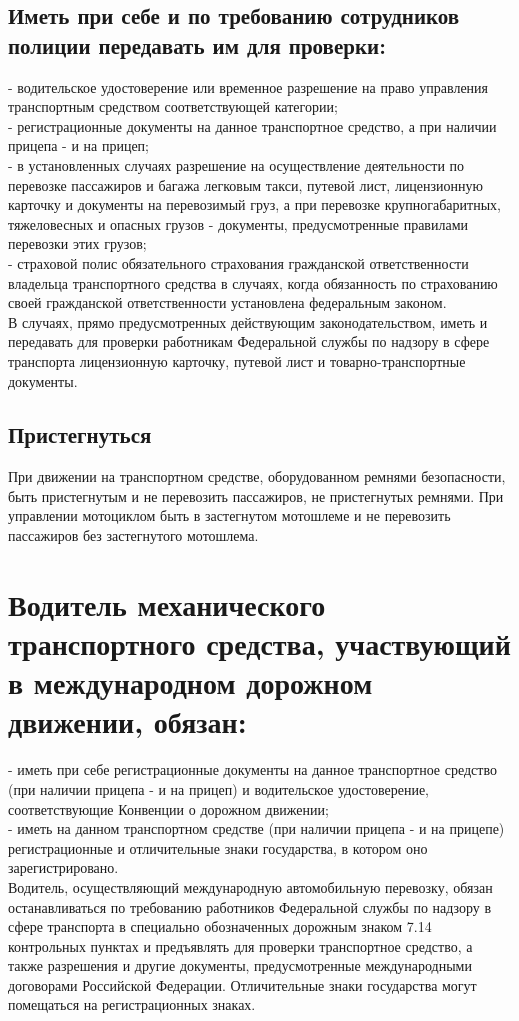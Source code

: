 \documentclass[russian,english,12pt,a4paper,reqno,dviphfm,oneside]{book}
\begin{document}
{\subsection[Иметь и предоставить]{Иметь при себе и по требованию сотрудников полиции передавать им для проверки:}
\noindent- водительское удостоверение или временное разрешение на право управления транспортным средством соответствующей категории;\\
- регистрационные документы на данное транспортное средство, а при наличии прицепа - и на прицеп;\\
- в установленных случаях разрешение на осуществление деятельности по перевозке пассажиров и багажа легковым такси, путевой лист, лицензионную карточку и документы на перевозимый груз, а при перевозке крупногабаритных, тяжеловесных и опасных грузов - документы, предусмотренные правилами перевозки этих грузов;\\
- страховой полис обязательного страхования гражданской ответственности владельца транспортного средства в случаях, когда обязанность по страхованию своей гражданской ответственности установлена федеральным законом.\\
В случаях, прямо предусмотренных действующим законодательством, иметь и передавать для проверки работникам Федеральной службы по надзору в сфере транспорта лицензионную карточку, путевой лист и товарно-транспортные документы.

\subsection{Пристегнуться} При движении на транспортном средстве, оборудованном ремнями безопасности, быть пристегнутым и не перевозить пассажиров, не пристегнутых ремнями. При управлении мотоциклом быть в застегнутом мотошлеме и не перевозить пассажиров без застегнутого мотошлема.\\

\section[Международное движение]{Водитель механического транспортного средства, участвующий в международном дорожном движении, обязан:}
\noindent- иметь при себе регистрационные документы на данное транспортное средство (при наличии прицепа - и на прицеп) и водительское удостоверение, соответствующие Конвенции о дорожном движении;\\
- иметь на данном транспортном средстве (при наличии прицепа - и на прицепе) регистрационные и отличительные знаки государства, в котором оно зарегистрировано.\\
Водитель, осуществляющий международную автомобильную перевозку, обязан останавливаться по требованию работников Федеральной службы по надзору в сфере транспорта в специально обозначенных дорожным знаком 7.14 контрольных пунктах и предъявлять для проверки транспортное средство, а также разрешения и другие документы, предусмотренные международными договорами Российской Федерации. Отличительные знаки государства могут помещаться на регистрационных знаках.\\


}
\end{document}
